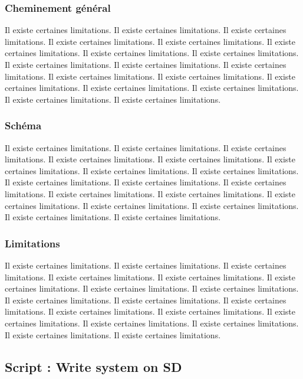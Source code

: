 \documentclass[11pt,a4paper,oneside]{report}
\begin{document}
\subsection{Cheminement général}

Il existe certaines limitations.
Il existe certaines limitations.
Il existe certaines limitations.
Il existe certaines limitations.
Il existe certaines limitations.
Il existe certaines limitations.
Il existe certaines limitations.
Il existe certaines limitations.
Il existe certaines limitations.
Il existe certaines limitations.
Il existe certaines limitations.
Il existe certaines limitations.
Il existe certaines limitations.
Il existe certaines limitations.
Il existe certaines limitations.
Il existe certaines limitations.
Il existe certaines limitations.
Il existe certaines limitations.
\subsection{Schéma}

Il existe certaines limitations.
Il existe certaines limitations.
Il existe certaines limitations.
Il existe certaines limitations.
Il existe certaines limitations.
Il existe certaines limitations.
Il existe certaines limitations.
Il existe certaines limitations.
Il existe certaines limitations.
Il existe certaines limitations.
Il existe certaines limitations.
Il existe certaines limitations.
Il existe certaines limitations.
Il existe certaines limitations.
Il existe certaines limitations.
Il existe certaines limitations.
Il existe certaines limitations.
Il existe certaines limitations.
\subsection{Limitations}

Il existe certaines limitations.
Il existe certaines limitations.
Il existe certaines limitations.
Il existe certaines limitations.
Il existe certaines limitations.
Il existe certaines limitations.
Il existe certaines limitations.
Il existe certaines limitations.
Il existe certaines limitations.
Il existe certaines limitations.
Il existe certaines limitations.
Il existe certaines limitations.
Il existe certaines limitations.
Il existe certaines limitations.
Il existe certaines limitations.
Il existe certaines limitations.
Il existe certaines limitations.
Il existe certaines limitations.

\begin{appendices}
  \chapter{Script : Write system on SD}

  \inputminted[xleftmargin=20pt, linenos=true, breaklines=true, frame=single, framesep=6pt, tabsize=2, fontfamily=courier, fontsize=\small]{bash}{../write_system_on_sd.sh}

\end{appendices}
\end{document}
